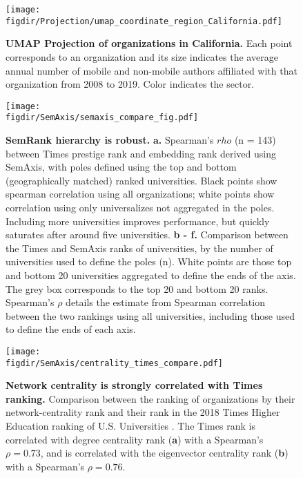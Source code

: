 \documentclass[12pt]{article} %
\def\figdir{../Figs}
\begin{document}
%
%
\begin{figure}[hp!]
	\centering
	\texttt{[image: \\figdir/Projection/umap\_coordinate\_region\_California.pdf]}
	\caption{
		\textbf{UMAP Projection of organizations in California.}
		Each point corresponds to an organization and its size indicates the average annual number of mobile and non-mobile authors affiliated with that organization from 2008 to 2019.
		Color indicates the sector.
	}
	\label{fig:supp:proj_california}
\end{figure}




%
%
\begin{figure}[hp!]
	\centering
	\texttt{[image: \\figdir/SemAxis/semaxis\_compare\_fig.pdf]}
	\caption{
		\textbf{SemRank hierarchy is robust.}
		\textbf{a.} Spearman's $rho$ (n = 143) between Times prestige rank and embedding rank derived using SemAxis, with poles defined using the top and bottom (geographically matched) ranked universities.
		Black points show spearman correlation using all organizations; white points show correlation using only universalizes not aggregated in the poles.
		Including more universities improves performance, but quickly saturates after around five universities.
		\textbf{b - f.} Comparison between the Times and SemAxis ranks of universities, by the number of universities used to define the poles (n).
		White points are those top and bottom 20 universities aggregated to define the ends of the axis.
		The grey box corresponds to the top 20 and bottom 20 ranks.
	  	Spearman's $\rho$ details the estimate from Spearman correlation between the two rankings using all universities, including those used to define the ends of each axis.
	}
	\label{fig:supp:semaxis_compare}
\end{figure}



%
%
\begin{figure}[hp!]
	\centering
	\texttt{[image: \\figdir/SemAxis/centrality\_times\_compare.pdf]}
	\caption{
		\textbf{Network centrality is strongly correlated with Times ranking.}
		Comparison between the ranking of organizations by their network-centrality rank and their rank in the 2018 Times Higher Education ranking of U.S. Universities .
		The Times rank is correlated with degree centrality rank (\textbf{a}) with a Spearman's $\rho = 0.73$, and is correlated with the eigenvector centrality rank (\textbf{b}) with a Spearman's $\rho = 0.76$.
	}
	\label{fig:supp:centrality_times_compare}
\end{figure}
\end{document}
